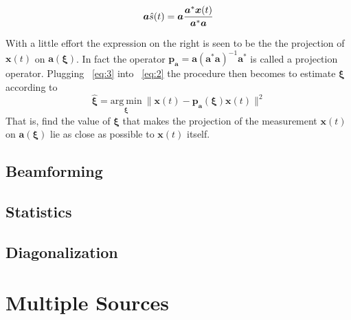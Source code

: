 \documentclass[11pt]{article}
\newcommand{\vct}[1]{\boldsymbol{#1}}
\begin{document}
\begin{equation}\label{eq:3}
\\\vct{a}\hat{s}(t) = \vct{a}\frac{\vct{a}^*\vct{x}(t)}{\vct{a}^*\vct{a}}
\end{equation}

With a little effort the expression on the right is seen to be the the projection of $\vct{x}(t)$ on $\vct{a}(\vct{\xi})$.
In fact the operator $\vct{p}_{\vct{a}}=\vct{a}(\vct{a}^*\vct{a})^{-1}\vct{a}^*$ is called a projection operator.
Plugging ~\eqref{eq:3} into ~\eqref{eq:2} the procedure then becomes to estimate $\vct{\xi}$ according to
\begin{equation}
    \hat{\vct{\xi}}=\underset{\vct{\xi}}{\mathrm{arg\ min}}\ \|\vct{x}(t)-\vct{p}_{\vct{a}}(\vct{\xi})\vct{x}(t)\|^2
\end{equation}
That is, find the value of $\vct{\xi}$ that makes the projection of the measurement $\vct{x}(t)$ on $\vct{a}(\vct{\xi})$ lie as close as possible to $\vct{x}(t)$ itself.

\subsection{Beamforming}

\subsection{Statistics}

\subsection{Diagonalization}

\section{Multiple Sources}
\end{document}
